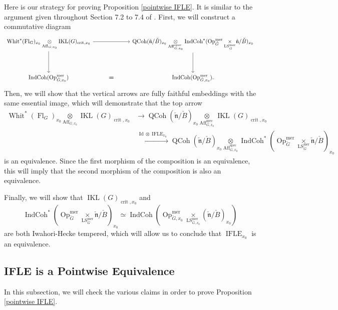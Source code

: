 \documentclass[10pt,a4paper]{amsart}
\newcommand{\on}[1]{\operatorname{#1}}
\newcommand{\QCoh}{\on{QCoh}}
\newcommand{\IndCoh}{\on{IndCoh}}
\newcommand{\IKLx}{\on{IKL}(G)_{\on{crit}, x_0}}
\newcommand{\Gcheck}{\check{G}}
\newcommand{\ncheck}{\check{\mathfrak{n}}}
\newcommand{\Bcheck}{\check{B}}
\newcommand{\sssec}[1]{\subsubsection{}}
\begin{document}
\sssec{}
Here is our strategy for proving Proposition \ref{pointwise IFLE}. It is similar to the argument given throughout Section 7.2 to 7.4 of \cite{GLC2}. First, we will construct a commutative diagram
$$
\begin{tikzcd}
	{\on{Whit}^*(\on{Fl}_G)_{x_0} \underset{\on{Aff}_{G, x_0}}{\otimes} \IKLx} && {\QCoh(\ncheck/\Bcheck)_{x_0} \underset{\on{Aff}_{G, x_0}^{\on{spec}}}{\otimes} \IndCoh^*(\on{Op}_{\Gcheck}^{\on{mer}} \underset{\on{LS}_{\Gcheck}^{\on{mer}}}{\times} \ncheck/\Bcheck)_{x_0}} \\
	\\
	{\IndCoh(\on{Op}_{\Gcheck, x_0}^{\on{mer}})} & {\boldsymbol{=}} & {\IndCoh(\on{Op}_{\Gcheck, x_0}^{\on{mer}}).}
	\arrow[from=1-1, to=1-3]
	\arrow[from=1-1, to=3-1]
	\arrow[from=1-3, to=3-3]
\end{tikzcd}
$$
Then, we will show that the vertical arrows are fully faithful embeddings with the same essential image, which will demonstrate that the top arrow
\begin{align}
\on{Whit}^*(\on{Fl}_G)_{x_0} \underset{\on{Aff}_{G, x_0}}{\otimes} \on{IKL}(G)_{\on{crit}, x_0} &\longrightarrow \QCoh(\ncheck/\Bcheck)_{x_0} \underset{\on{Aff}_{G, x_0}^{\on{spec}}}{\otimes} \on{IKL}(G)_{\on{crit}, x_0} \\ &\overset{\on{Id} \otimes \on{IFLE}_{x_0}}{\longrightarrow} \QCoh(\ncheck/\Bcheck)_{x_0} \underset{\on{Aff}_{G, x_0}^{\on{spec}}}{\otimes} \IndCoh^*(\on{Op}_{\Gcheck}^{\on{mer}} \underset{\on{LS}_{\Gcheck}^{\on{mer}}}{\times} \ncheck/\Bcheck)_{x_0}
\end{align}
is an equivalence. Since the first morphism of the composition is an equivalence, this will imply that the second morphism of the composition is also an equivalence.

Finally, we will show that $\IKLx$ and 
$$
\IndCoh^*(\on{Op}_{\Gcheck}^{\on{mer}} \underset{\on{LS}_{\Gcheck}^{\on{mer}}}{\times} \ncheck/\Bcheck)_{x_0} \simeq \IndCoh(\on{Op}_{\Gcheck, x_0}^{\on{mer}} \underset{\on{LS}_{\Gcheck, x_0}^{\on{mer}}}{\times} (\ncheck/\Bcheck)_{x_0})
$$
are both Iwahori-Hecke tempered, which will allow us to conclude that $\on{IFLE}_{x_0}$ is an equivalence.

\subsection{IFLE is a Pointwise Equivalence} \label{IFLE is a Pointwise Equivalence}
In this subsection, we will check the various claims in order to prove Proposition \ref{pointwise IFLE}.
\end{document}
